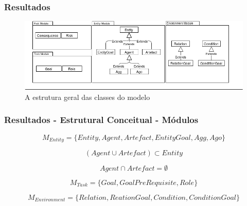 \documentclass{beamer}
\begin{document}
\begin{frame}
	\frametitle{Resultados}
	\begin{figure}[H]
	  \centering
	  \includegraphics[width=1\linewidth]{figure/Module.png} 
	  \caption{A estrutura geral das classes do modelo}
	  \label{module}
	\end{figure} 
\end{frame}

\begin{frame}
	\frametitle{Resultados - Estrutural Conceitual - Módulos}
 	\begin{equation} 
		M_{Entity} = \{ Entity, Agent, Artefact, EntityGoal, Agg, Ago\}
	\end{equation}\label{modent}

	\begin{equation} \label{defineentity} 
		( Agent \cup Artefact ) \subset Entity
	\end{equation}

	\begin{equation} \label{agentsartefactvoid}
    	Agent \cap Artefact = \emptyset
	\end{equation}

	\begin{equation}
    	M_{Task} = \{ Goal, GoalPreRequisite, Role \}
	\end{equation}

	\begin{equation}
	    M_{Environment} = \{ Relation, ReationGoal, Condition, ConditionGoal \}
	\end{equation}

\end{frame}
\end{document}
